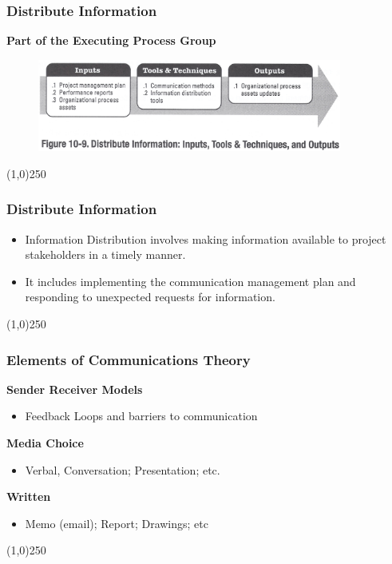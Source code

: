 \begin{frame}
\frametitle{Distribute Information} 
\textbf{Part of the Executing Process Group}
\begin{figure}
	\centering
		\includegraphics[width = 10cm]{images/Fig10-9.jpg}
	\label{fig:10-9}
\end{figure}
\end{frame}\begin{center}\line(1,0){250}\end{center}


\begin{frame}
\frametitle{Distribute Information}
\begin{itemize}
	\item Information Distribution involves making information available to project stakeholders in a timely manner.
	\item It includes implementing the communication management plan and responding to unexpected requests for information.
\end{itemize}
\end{frame}\begin{center}\line(1,0){250}\end{center}


\begin{frame}
\frametitle{Elements of Communications Theory}
\textbf{Sender Receiver Models}
\begin{itemize}
	\item Feedback Loops and barriers to communication
\end{itemize}
\textbf{Media Choice}
\begin{itemize}
	\item Verbal, Conversation; Presentation; etc.
\end{itemize}
\textbf{Written}
\begin{itemize}
	\item Memo (email); Report; Drawings; etc
\end{itemize}
\end{frame}\begin{center}\line(1,0){250}\end{center}



